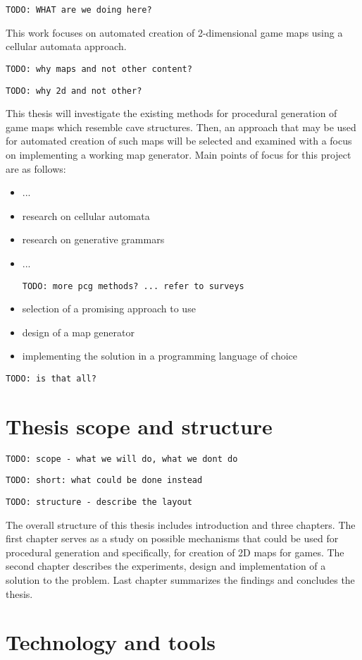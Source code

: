 \documentclass[12pt]{report}
\newcommand{\todo}[1]{}
\renewcommand{\todo}[1]{{\color{red} \par \noindent \footnotesize \texttt{TODO: {#1} }}}
\begin{document}
\todo{WHAT are we doing here?}

This work focuses on automated creation of 2-dimensional game maps using a cellular automata approach.  

\todo{why maps and not other content?}
\todo{why 2d and not other?}


This thesis will investigate the existing methods for procedural generation of game maps which resemble cave structures. Then, an approach that may be used for automated creation of such maps will be selected and examined with a focus on implementing a working map generator. Main points of focus for this project are as follows:

\begin{itemize}
	\item ...
	\item research on cellular automata
	\item research on generative grammars
	\item ... \todo{more pcg methods? ...  refer to surveys}
	\item selection of a promising approach to use
	\item design of a map generator
	\item implementing the solution in a programming language of choice
\end{itemize}

\todo{is that all?}

\section{Thesis scope and structure}

\todo{scope - what we will do, what we dont do}

\todo{short: what could be done instead}

\todo{structure - describe the layout}

The overall structure of this thesis includes introduction and three chapters. The first chapter serves as a study on possible mechanisms that could be used for procedural generation and specifically, for creation of 2D maps for games. The second chapter describes the experiments, design and implementation of a solution to the problem. Last chapter summarizes the findings and concludes the thesis.


\section{Technology and tools}
\end{document}
